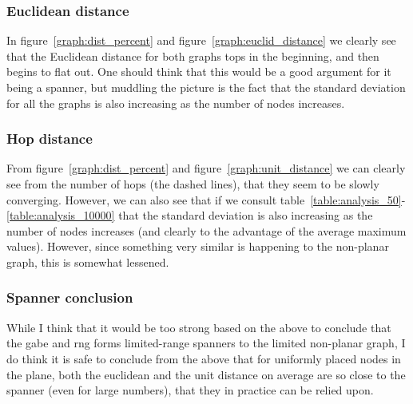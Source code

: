 \subsubsection{Euclidean distance}

In figure~\ref{graph:dist_percent} and figure~\ref{graph:euclid_distance} we clearly see that the Euclidean distance for both graphs tops in the beginning, and then begins to flat out. One should think that this would be a good argument for it being a spanner, but muddling the picture is the fact that the standard deviation for all the graphs is also increasing as the number of nodes increases.

\subsubsection{Hop distance}


From figure~\ref{graph:dist_percent} and figure~\ref{graph:unit_distance} we can clearly see from the number of hops (the dashed lines), that they seem to be slowly converging. However, we can also see that if we consult table~\ref{table:analysis_50}-\ref{table:analysis_10000} that the standard deviation is also increasing as the number of nodes increases (and clearly to the advantage of the average maximum values). However, since something very similar is happening to the non-planar graph, this is somewhat lessened.

\subsubsection{Spanner conclusion}

While I think that it would be too strong based on the above to conclude that the \ac{gabe} and \ac{rng} forms limited-range spanners to the limited non-planar graph, I do think it is safe to conclude from the above that for uniformly placed nodes in the plane, both the euclidean and the unit distance on average are so close to the spanner (even for large numbers), that they in practice can be relied upon.

\subsection{}
